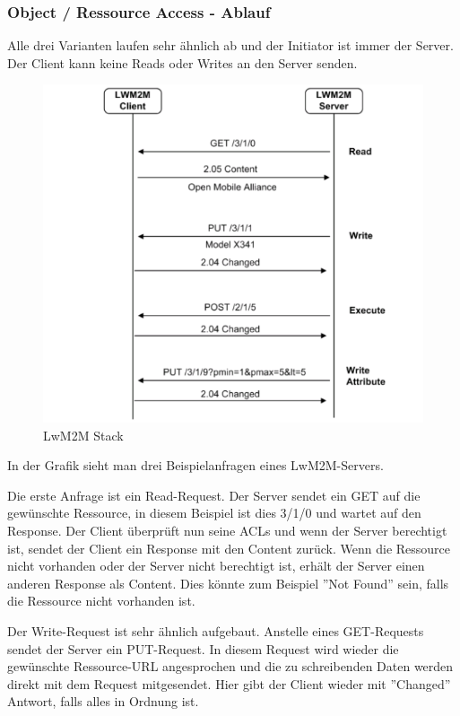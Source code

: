 \subsubsection{Object / Ressource Access - Ablauf}
Alle drei Varianten laufen sehr ähnlich ab und der Initiator ist immer der Server. Der Client kann keine Reads oder Writes an den Server senden.
\begin{figure}[H]
\includegraphics[scale=0.65]{../02_Analyse/images/lwm2m/command_diagram.png}
\caption{LwM2M Stack\cite{LwM2MInterfaces}}
\end{figure}
In der Grafik sieht man drei Beispielanfragen eines LwM2M-Servers.

Die erste Anfrage ist ein Read-Request. Der Server sendet ein GET auf die gewünschte Ressource, in diesem Beispiel ist dies 3/1/0 und wartet auf den Response. Der Client überprüft nun seine ACLs und wenn der Server berechtigt ist, sendet der Client ein Response  mit den Content zurück. Wenn die Ressource nicht vorhanden oder der Server nicht berechtigt ist, erhält der Server einen anderen Response als Content. Dies könnte zum Beispiel ''Not Found'' sein, falls die Ressource nicht vorhanden ist.

Der Write-Request ist sehr ähnlich aufgebaut. Anstelle eines GET-Requests sendet der Server ein PUT-Request. In diesem Request wird wieder die gewünschte Ressource-URL angesprochen und die zu schreibenden Daten werden direkt mit dem Request mitgesendet. Hier gibt der Client wieder mit ''Changed'' Antwort, falls alles in Ordnung ist.


